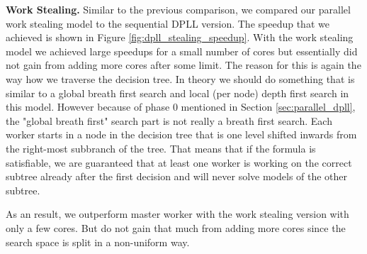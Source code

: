 \documentclass[letterpaper]{article}
\newcommand{\mypar}[1]{{\bf #1.}}
\begin{document}
\mypar{Work Stealing}
Similar to the previous comparison, we compared our parallel work stealing model to the sequential DPLL version.
The speedup that we achieved is shown in Figure \ref{fig:dpll_stealing_speedup}.
With the work stealing model we achieved large speedups for a small number of cores but essentially did not gain from adding more cores after some limit.
The reason for this is again the way how we traverse the decision tree.
In theory we should do something that is similar to a global breath first search and local (per node) depth first search in this model.
However because of phase 0 mentioned in Section \ref{sec:parallel_dpll}, the "global breath first" search part is not really a breath first search.
Each worker starts in a node in the decision tree that is one level shifted inwards from the right-most subbranch of the tree.
That means that if the formula is satisfiable, we are guaranteed that at least one worker is working on the correct subtree already after the first decision and will never solve models of the other subtree.

As an result, we outperform master worker with the work stealing version with only a few cores.
But do not gain that much from adding more cores since the search space is split in a non-uniform way.
\end{document}
